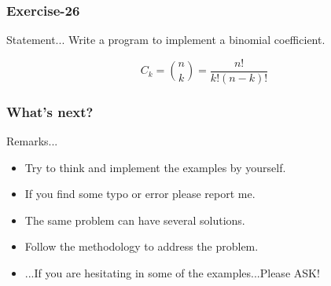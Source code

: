 \documentclass[xcolor=dvipsnames,dvip,notes=show,handout,table]{beamer}
\begin{document}
\begin{frame}[fragile]
\frametitle{Exercise-26}
\begin{block}{Statement...}
Write a program to implement a binomial coefficient.
\end{block}
% 

\begin{equation}
C_{k} = \binom{n}{k} = \frac{n!}{k!(n-k)!} 
\end{equation}

\end{frame}



\begin{frame}[fragile]
\frametitle{What's next?}
\begin{exampleblock}{Remarks...}
\begin{itemize}
 \item Try to think and implement the examples by yourself.
 \item If you find some typo or error please report me.
 \item The same problem can have several solutions.
 \item Follow the methodology to address the problem.
 \item ...If you are hesitating in some of the examples...Please ASK!
\end{itemize}

\end{exampleblock}



\end{frame}

% 
\frame{
\titlepage

}


\end{document}
